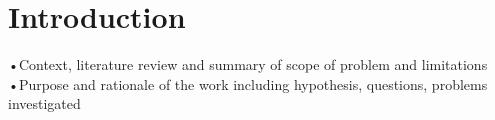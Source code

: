 \section{Introduction}

•Context, literature review and summary of scope of problem and limitations
•Purpose and rationale of the work including hypothesis, questions, problems
investigated